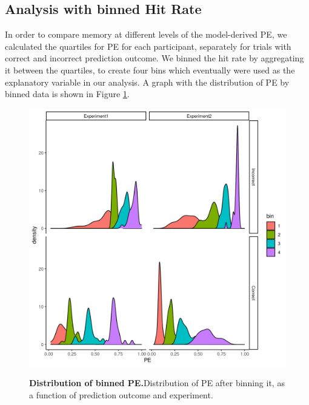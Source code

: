 \documentclass[a4paper,12pt]{article}
\begin{document}
\subsection*{Analysis with binned Hit Rate}
In order to compare memory at different levels of the model-derived PE, we calculated the quartiles for PE for each participant, separately for trials with correct and incorrect prediction outcome.
We binned the hit rate by aggregating it between the quartiles, to create four bins which eventually were used as the explanatory variable in our analysis. A graph with the distribution of PE by binned data is shown in Figure \ref{fig:PEbin_distr}.

\begin{figure}[ht!]
{\includegraphics[width=1\textwidth]{figures/PEdistr_binned.png}}
\caption{\textbf{Distribution of binned PE.}Distribution of PE after binning it, as a function of prediction outcome and experiment. }
\label{fig:PEbin_distr}

\end{figure}
\end{document}
